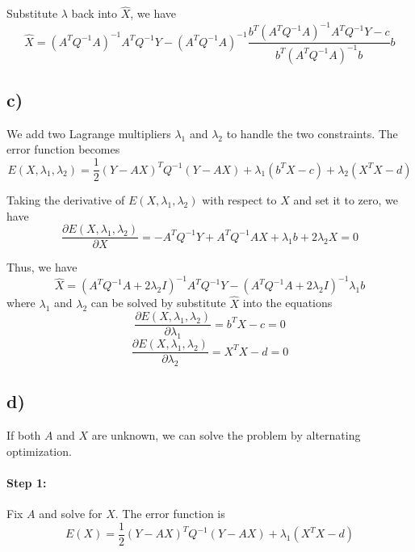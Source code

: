 \documentclass[a4paper,12pt]{article}
\newcommand{\pard}[2]{\frac{\partial #1}{\partial #2}}
\begin{document}
Substitute $\lambda$ back into $\hat{X}$, we have
\begin{equation*}
	\hat{X} = (A^T Q^{-1} A)^{-1} A^T Q^{-1} Y - (A^T Q^{-1} A)^{-1} \frac{b^T (A^T Q^{-1} A)^{-1} A^T Q^{-1} Y - c}{b^T (A^T Q^{-1} A)^{-1} b} b
\end{equation*}

\subsection*{c)}

We add two Lagrange multipliers $\lambda_1$ and $\lambda_2$ to handle the two constraints. The error function becomes
\begin{equation*}
	E(X, \lambda_1, \lambda_2) = \frac{1}{2} (Y - AX)^T Q^{-1} (Y - AX) + \lambda_1 (b^T X - c) + \lambda_2 (X^T X - d)
\end{equation*}

Taking the derivative of $E(X, \lambda_1, \lambda_2)$ with respect to $X$ and set it to zero, we have
\begin{equation*}
	\pard{E(X, \lambda_1, \lambda_2)}{X} = - A^T Q^{-1} Y + A^T Q^{-1} A X + \lambda_1 b + 2 \lambda_2 X = 0
\end{equation*}

Thus, we have
\begin{equation*}
	\hat{X} = (A^T Q^{-1} A + 2 \lambda_2 I)^{-1} A^T Q^{-1} Y - (A^T Q^{-1} A + 2 \lambda_2 I)^{-1} \lambda_1 b
\end{equation*}
where $\lambda_1$ and $\lambda_2$ can be solved by substitute $\hat{X}$ into the equations
\begin{equation*}
	\pard{E(X, \lambda_1, \lambda_2)}{\lambda_1} = b^T X - c = 0
\end{equation*}
\begin{equation*}
	\pard{E(X, \lambda_1, \lambda_2)}{\lambda_2} = X^T X - d = 0
\end{equation*}


\subsection*{d)}

If both $A$ and $X$ are unknown, we can solve the problem by alternating optimization.

\paragraph{Step 1:}
Fix $A$ and solve for $X$. The error function is
\begin{equation*}
	E(X) = \frac{1}{2} (Y - AX)^T Q^{-1} (Y - AX) + \lambda_1 (X^T X - d)
\end{equation*}
\end{document}
